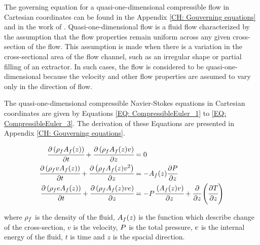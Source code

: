 \documentclass[../Article_Sensitivity_Analsysis.tex]{subfiles}
\begin{document}
	
	The governing equation for a quasi-one-dimensional compressible flow in Cartesian coordinates can be found in the Appendix \ref{CH: Gouverning equations} and in the work of \citet{Anderson1995}. Quasi-one-dimensional flow is a fluid flow characterized by the assumption that the flow properties remain uniform across any given cross-section of the flow. This assumption is made when there is a variation in the cross-sectional area of the flow channel, such as an irregular shape or partial filling of an extractor. In such cases, the flow is considered to be quasi-one-dimensional because the velocity and other flow properties are assumed to vary only in the direction of flow.
	
	The quasi-one-dimensional compressible Navier-Stokes equations in Cartesian coordinates are given by Equations \ref{EQ: CompressibleEuler_1} to \ref{EQ: CompressibleEuler_3}. The derivation of these Equations are presented in Appendix \ref{CH: Gouverning equations}.
	
	{\footnotesize
		\begin{align}
			\label{EQ: CompressibleEuler_1}
			\cfrac{\partial \left( {\color{black}\rho_f} {\color{black}A_f}(z) \right) }{\partial t} + \cfrac{\partial \left( {\color{black}\rho_f} {\color{black}A_f}(z) v \right)}{\partial z} &= 0 \\
			\cfrac{\partial \left( {\color{black}\rho_f} v {\color{black}A_f}(z) \right) }{\partial t} + \cfrac{\partial \left( {\color{black}\rho_f} {\color{black}A_f}(z) v^2 \right)}{\partial z} &= -{\color{black}A_f}(z) \cfrac{\partial {\color{black}P}}{\partial z} \label{EQ: CompressibleEuler_2} \\
			\cfrac{\partial \left( {\color{black}\rho_f} {\color{black}e} {\color{black}A_f}(z) \right) }{\partial t} + \cfrac{\partial \left( {\color{black}\rho_f} {\color{black}A_f}(z) v {\color{black}e}\right)}{\partial z} &= -{\color{black}P}\cfrac{\left( {\color{black}A_f}(z) v \right)}{\partial z} + \cfrac{\partial}{\partial z} \left( \cfrac{\partial {\color{black}T}}{\partial z} \right)   
			\label{EQ: CompressibleEuler_3}
		\end{align}  
	}
	
	where ${\color{black}\rho_f}$ is the density of the fluid, ${\color{black}A_f}(z)$ is the function which describe change of the cross-section, $v$ is the velocity, ${\color{black}P}$ is the total pressure, ${\color{black}e}$ is the internal energy of the fluid, $t$ is time and $z$ is the spacial direction.
	
\end{document}
